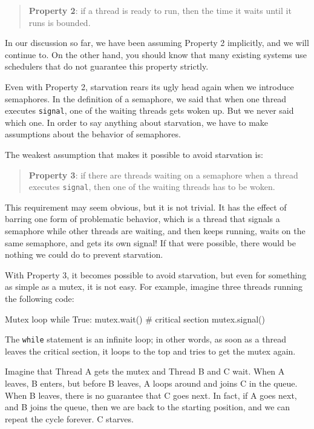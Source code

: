 \begin{quote}
\textbf{Property 2}: if a thread is ready to run, then the time it
waits until it runs is bounded.
\end{quote}

In our discussion so far, we have been assuming Property 2
implicitly, and we will continue to.  On the other hand,
you should know that many existing systems use schedulers
that do not guarantee this property strictly.

Even with Property 2, starvation rears its ugly head again
when we introduce semaphores.  In the definition of a semaphore,
we said that when one thread executes {\tt signal}, one of
the waiting threads gets woken up.  But we never said which one.
In order to say anything about starvation, we have to
make assumptions about the behavior of semaphores.

The weakest assumption that makes it possible to avoid
starvation is:

\begin{quote}
\textbf{Property 3}: if there are threads waiting on a semaphore when
a thread executes {\tt signal}, then one of the waiting threads
has to be woken.
\end{quote}

This requirement may seem obvious, but it is not trivial.  It has the
effect of barring one form of problematic behavior, which is a thread
that signals a semaphore while other threads are waiting, and then
keeps running, waits on the same semaphore, and gets its own signal!
If that were possible, there would be nothing we
could do to prevent starvation.

With Property 3, it becomes possible to avoid starvation, but
even for something as simple as a mutex, it is not easy.
For example, imagine three threads
running the following code:

\begin{lstbox}{Mutex loop}
while True:
    mutex.wait()
    # critical section 
    mutex.signal()
\end{lstbox}

The {\tt while} statement is an infinite loop; in other words,
as soon as a thread leaves the critical section, it loops to the
top and tries to get the mutex again.

Imagine that Thread A gets the mutex and Thread B and C wait.
When A leaves, B enters, but before B leaves, A loops around
and joins C in the queue.  When B leaves, there is no guarantee
that C goes next.  In fact, if A goes next, and B joins the
queue, then we are back to the starting position, and we can
repeat the cycle forever.  C starves.

